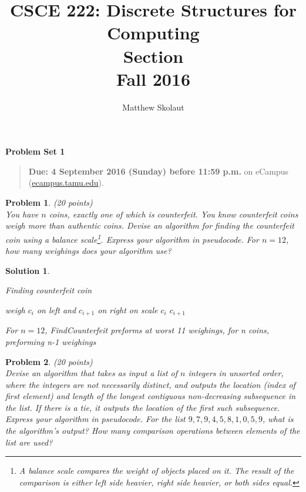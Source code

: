 \documentclass{article}
\title{CSCE 222: Discrete Structures for Computing\\Section \mysectionnumber\\Fall 2016}
\author{Matthew Skolaut}
\theoremstyle{plain}
\newtheorem{problem}{Problem}
\theoremstyle{break}
\newtheorem{solution}{Solution}
\newcommand{\problemset}[1]{\begin{center}\textbf{Problem Set #1}\end{center}}
\newcommand{\duedate}[1]{\begin{quote}\textbf{Due: #1} on eCampus (\url{ecampus.tamu.edu}).\end{quote}}
\begin{document}
\maketitle

\problemset{1}

\duedate{4 September 2016 (Sunday) before 11:59 p.m.}

\bigskip

\begin{problem} (20 points)\\
You have $n$ coins, exactly one of which is counterfeit.  You know counterfeit coins weigh more than authentic coins.  Devise an algorithm for finding the counterfeit coin using a balance scale\footnote{A balance scale compares the weight of objects placed on it.  The result of the comparison is either left side heavier, right side heavier, or both sides equal.}.  Express your algorithm in pseudocode.  For $n=12$, how many weighings does your algorithm use? 
\end{problem}

\begin{solution}
\begin{algorithm}
\caption{Finding counterfeit coin}
\begin{algorithmic}[1]
		\State weigh $c_i$ on left and $c_{i+1}$ on right on scale
			\State \Return $c_i$
			\State \Return $c_{i+1}$
		\EndIf
	\EndFor
\EndProcedure
\end{algorithmic}
\end{algorithm}
For $n=12$, FindCounterfeit preforms at worst 11 weighings, for n coins, preforming n-1 weighings
\end{solution}

\newpage

\begin{problem} (20 points)\\
Devise an algorithm that takes as input a list of $n$ integers in unsorted order, where the integers are not necessarily distinct, and outputs the location (index of first element) and length of the longest contiguous non-decreasing subsequence in the list.  If there is a tie, it outputs the location of the first such subsequence.  Express your algorithm in pseudocode.  For the list $9,7,9,4,5,8,1,0,5,9$, what is the algorithm's output? How many comparison operations between elements of the list are used?
\end{problem}
\end{document}
